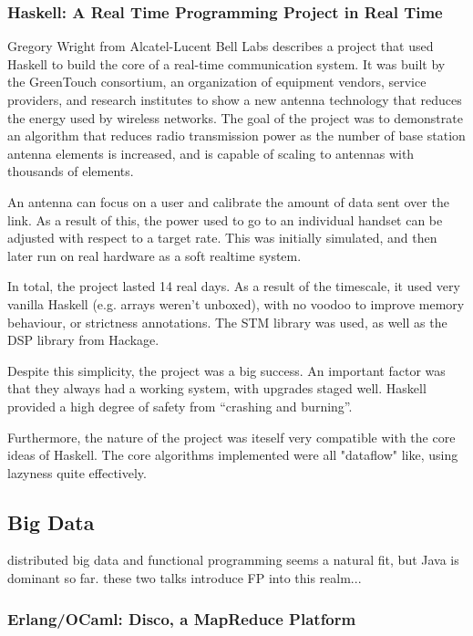 \documentclass{jfp1}
\begin{document}
\subsubsection{Haskell: A Real Time Programming Project in Real Time}

Gregory Wright from Alcatel-Lucent Bell Labs describes a project that used Haskell 
to build the core of a real-time communication system.  It was built by
the GreenTouch consortium, an organization of equipment
vendors, service providers, and research institutes to
show a new antenna technology that reduces the energy used
by wireless networks.  The goal of the project was to demonstrate
an algorithm that reduces radio transmission power as the number
of base station antenna elements is increased, and is capable of scaling
to antennas with thousands of elements.

An antenna can focus on a user and calibrate the amount of data sent over the
link. As a result of this, the power used to go to an individual handset can be
adjusted with respect to a target rate.  This was initially simulated, and then
later run on real hardware as a soft realtime system.

In total, the project lasted 14 real days. As a result of the timescale, it
used very vanilla Haskell (e.g. arrays weren't unboxed), with no voodoo to
improve memory behaviour, or strictness annotations. The STM library was used,
as well as the DSP library from Hackage.

Despite this simplicity, the project was a big success. An important factor was that 
they always had a working system, with upgrades staged well. Haskell provided a high
degree of safety from ``crashing and burning''.

Furthermore, the nature of the project was iteself very compatible with the core
ideas of Haskell. The core algorithms implemented were all "dataflow" like, using
lazyness quite effectively.

\subsection{Big Data}

distributed big data and functional programming seems a natural fit, but Java is dominant so far. these two talks introduce FP into this realm...

\subsubsection{Erlang/OCaml: Disco, a MapReduce Platform}
\end{document}
